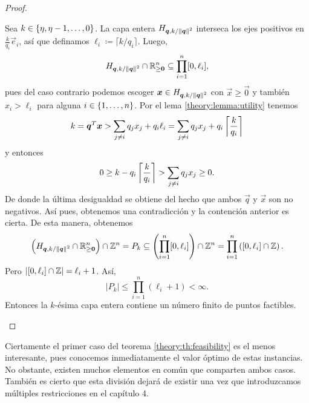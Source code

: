 \begin{proof}
\begin{enumerate}
			Sea $k \in \lbrace \eta, \eta - 1, \ldots, 0 \rbrace$. La capa entera $H_{\boldsymbol{q}, k/\left\lVert \boldsymbol{q} \right\rVert^{2}}$
			interseca los ejes positivos en $\frac{k}{q_i}\vec{e}_i$,
			así que definamos $\ell_i \coloneq \lceil k/q_i \rceil$. Luego,
			\begin{equation*}
				H_{\boldsymbol{q}, k/\left\lVert \boldsymbol{q} \right\rVert^{2}} \cap \mathbb{R}^n_{\geq \boldsymbol{0}} \subseteq \prod_{i = 1}^{n} [0, \ell_i],
			\end{equation*}
			pues del caso contrario podemos escoger $\boldsymbol{x} \in H_{\boldsymbol{q}, k/\left\lVert \boldsymbol{q} \right\rVert^{2}}$ con $\vec{x} \geq
			\vec{0}$ y también $x_i > \ell_i$ para alguna $i \in \lbrace 1, \ldots, n \rbrace$. Por el lema
			\ref{theory:lemma:utility} tenemos
			\begin{equation*}
				k = \boldsymbol{q}^T\boldsymbol{x} > \sum_{j \neq i}q_jx_j + q_i\ell_i = \sum_{j \neq i}q_jx_j + q_i\left\lceil \frac{k}{q_i} \right\rceil
			\end{equation*}
			y entonces
			\begin{equation*}
				0 \geq k - q_i\left\lceil \frac{k}{q_i} \right\rceil > \sum_{j \neq i}q_jx_j \geq 0.
			\end{equation*}
			De donde la última desigualdad se obtiene del hecho que ambos $\vec{q}$ y $\vec{x}$ son
			no negativos. Así pues, obtenemos una contradicción y la contención anterior es cierta.
			De esta manera, obtenemos
			\begin{equation*}
				\left( H_{\boldsymbol{q}, k/\left\lVert \boldsymbol{q} \right\rVert^{2}} \cap \mathbb{R}^n_{\geq \boldsymbol{0}} \right) \cap \mathbb{Z}^n = P_k
				\subseteq \left( \prod_{i = 1}^{n} [0, \ell_i] \right) \cap \mathbb{Z}^n = \prod_{i = 1}^{n}
				\left( [0, \ell_i] \cap \mathbb{Z} \right).
			\end{equation*}
			Pero $\left| [0, \ell_i] \cap \mathbb{Z} \right| = \ell_i + 1$. Así,
			\begin{equation*}
				|P_k| \leq \prod_{i = 1}^{n} (\ell_i + 1) < \infty.
			\end{equation*}
			Entonces la $k$-ésima capa entera contiene un número finito de puntos factibles.
	\end{enumerate}
\end{proof}


Ciertamente el primer caso del teorema \ref{theory:th:feasibility} es el menos interesante, pues
conocemos inmediatamente el valor óptimo de estas instancias. No obstante, existen muchos elementos
en común que comparten ambos casos. También es cierto que esta división dejará de existir una vez
que introduzcamos múltiples restricciones en el capítulo 4.

